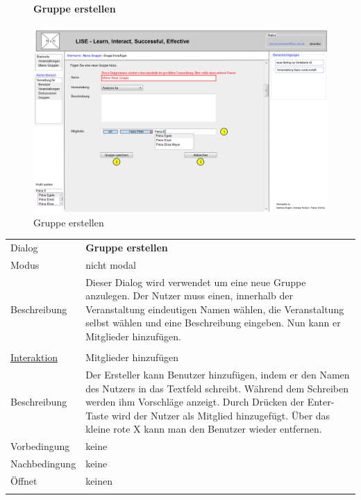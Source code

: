 \documentclass[12pt,a4paper]{article}
\begin{document}
{\begin{tabular}{l p{12cm}}
\end{tabular}\\\\

\begin{figure}[H]
	\centering
	\paragraph{Gruppe erstellen}
	\includegraphics[width=\textwidth]{Bilder/Mockups/GUI/GruppeErstellen.png}
	\caption{Gruppe erstellen}
	\label{GuiGruppeErstellen}
\end{figure}
\begin{tabular}{l p{12cm}}
	Dialog 	 & \textbf{Gruppe erstellen} \\ 
	Modus & nicht modal\\ 
	Beschreibung   	& Dieser Dialog wird verwendet um eine neue Gruppe anzulegen. Der Nutzer muss einen, innerhalb der Veranstaltung eindeutigen Namen wählen, die Veranstaltung selbst wählen und eine Beschreibung eingeben. Nun kann er Mitglieder hinzufügen. \\\\
	
	\underline{Interaktion} 	 & Mitglieder hinzufügen\\ 
	Beschreibung   	& Der Ersteller kann Benutzer hinzufügen, indem er den Namen des Nutzers in das Textfeld schreibt. Während dem Schreiben werden ihm Vorschläge anzeigt. Durch Drücken der Enter-Taste wird der Nutzer als Mitglied hinzugefügt. Über das kleine rote X kann man den Benutzer wieder entfernen.\\
	Vorbedingung	& keine \\
	Nachbedingung	& keine \\
	Öffnet			& keinen\\\\
\end{tabular}

}
\end{document}
